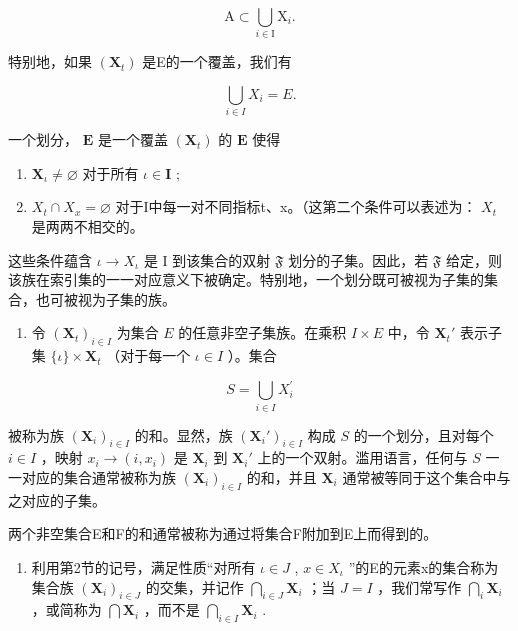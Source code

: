\[
\mathrm{A} \subset \bigcup_ {i \in \mathrm{I}} \mathrm{X} _ {i}.
\]

特别地，如果 \((\mathbf{X}_{t})\) 是E的一个覆盖，我们有

\[
\bigcup_ {i \in I} X _ {i} = E.
\]

一个划分， \(\mathbf{E}\) 是一个覆盖 \((\mathbf{X}_t)\) 的 \(\mathbf{E}\) 使得

\begin{enumerate}
\def\labelenumi{(\alph{enumi})}
\item
  \(\mathbf{X}_{\iota} \neq \varnothing\) 对于所有 \(\iota \in \mathbf{I}\) ;
\item
  \(X_{t} \cap X_{x} = \varnothing\) 对于I中每一对不同指标t、x。（这第二个条件可以表述为： \(X_{t}\) 是两两不相交的。
\end{enumerate}

这些条件蕴含 \(\iota \to X_{\iota}\) 是 I 到该集合的双射 \(\mathfrak{F}\) 划分的子集。因此，若 \(\mathfrak{F}\) 给定，则该族在索引集的一一对应意义下被确定。特别地，一个划分既可被视为子集的集合，也可被视为子集的族。

\begin{enumerate}
\def\labelenumi{\arabic{enumi}.}
\setcounter{enumi}{4}
\tightlist
\item
  令 \((\mathbf{X}_t)_{i \in I}\) 为集合 \(E\) 的任意非空子集族。在乘积 \(I \times E\) 中，令 \(\mathbf{X}_t'\) 表示子集 \(\{\iota\} \times \mathbf{X}_t\) （对于每一个 \(\iota \in I\) ）。集合
\end{enumerate}

\[
S = \bigcup_ {i \in I} X _ {i} ^ {\prime}
\]

被称为族 \((\mathbf{X}_i)_{i\in I}\) 的和。显然，族 \((\mathbf{X}_i')_{i\in I}\) 构成 \(S\) 的一个划分，且对每个 \(i\in I\) ，映射 \(x_i\to (i,x_i)\) 是 \(\mathbf{X}_i\) 到 \(\mathbf{X}_i'\) 上的一个双射。滥用语言，任何与 \(S\) 一一对应的集合通常被称为族 \((\mathbf{X}_i)_{i\in I}\) 的和，并且 \(\mathbf{X}_i\) 通常被等同于这个集合中与之对应的子集。

两个非空集合E和F的和通常被称为通过将集合F附加到E上而得到的。

\begin{enumerate}
\def\labelenumi{\arabic{enumi}.}
\setcounter{enumi}{5}
\tightlist
\item
  利用第2节的记号，满足性质“对所有 \(\iota\in J\) , \(x\in X_{\iota}\) ”的E的元素x的集合称为集合族 \((\mathbf{X}_i)_{i \in J}\) 的交集，并记作 \(\bigcap_{i \in J} \mathbf{X}_i\) ；当 \(J = I\) ，我们常写作 \(\bigcap_{i} \mathbf{X}_i\) ，或简称为 \(\bigcap \mathbf{X}_i\) ，而不是 \(\bigcap_{i \in I} \mathbf{X}_i\) .
\end{enumerate}

